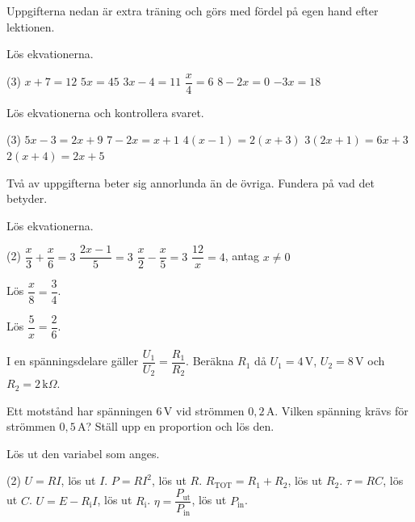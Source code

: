 Uppgifterna nedan är extra träning och görs med fördel på egen hand efter lektionen.

Lös ekvationerna.
\begin{delar}(3)
  \task $x + 7 = 12$
  \task $5x = 45$
  \task $3x - 4 = 11$
  \task $\dfrac{x}{4} = 6$
  \task $8 - 2x = 0$
  \task $-3x = 18$
\end{delar}

Lös ekvationerna och kontrollera svaret.
\begin{delar}(3)
  \task $5x - 3 = 2x + 9$
  \task $7 - 2x = x + 1$
  \task $4(x - 1) = 2(x + 3)$
  \task $3(2x + 1) = 6x + 3$
  \task $2(x + 4) = 2x + 5$
\end{delar}

\begin{aside}
\note[Tips] Två av uppgifterna beter sig annorlunda än de övriga. Fundera på vad det betyder.
\end{aside}

Lös ekvationerna.
\begin{delar}(2)
  \task $\dfrac{x}{3} + \dfrac{x}{6} = 3$
  \task $\dfrac{2x - 1}{5} = 3$
  \task $\dfrac{x}{2} - \dfrac{x}{5} = 3$
  \task $\dfrac{12}{x} = 4$, antag $x \neq 0$
\end{delar}

\begin{parts}
  \item Lös $\dfrac{x}{8} = \dfrac{3}{4}$.
  \item Lös $\dfrac{5}{x} = \dfrac{2}{6}$.
  \item I en spänningsdelare gäller $\dfrac{U_1}{U_2} = \dfrac{R_1}{R_2}$. Beräkna $R_1$ då
    $U_1 = 4\,\text{V}$, $U_2 = 8\,\text{V}$ och $R_2 = 2\,\text{k}\Omega$.
  \item Ett motstånd har spänningen $6\,\text{V}$ vid strömmen $0{,}2\,\text{A}$. Vilken spänning
    krävs för strömmen $0{,}5\,\text{A}$? Ställ upp en proportion och lös den.
\end{parts}

Lös ut den variabel som anges.
\begin{delar}(2)
  \task $U = RI$, lös ut $I$.
  \task $P = RI^2$, lös ut $R$.
  \task $R_{\text{TOT}} = R_1 + R_2$, lös ut $R_2$.
  \task $\tau = RC$, lös ut $C$.
  \task $U = E - R_{\text{i}}I$, lös ut $R_{\text{i}}$.
  \task $\eta = \dfrac{P_{\text{ut}}}{P_{\text{in}}}$, lös ut $P_{\text{in}}$.
\end{delar}

